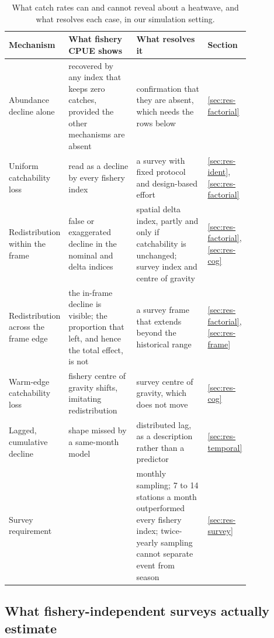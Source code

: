 \documentclass[11pt,a4paper]{article}
\begin{document}
\begin{table}[tbp]
\centering\footnotesize
\caption{What catch rates can and cannot reveal about a heatwave, and what resolves each case, in our simulation setting.}
\label{tab:synthesis}
\begin{tabular}{@{}>{\raggedright\arraybackslash}p{0.2\linewidth}>{\raggedright\arraybackslash}p{0.3\linewidth}>{\raggedright\arraybackslash}p{0.32\linewidth}l@{}}
\toprule
Mechanism & What fishery CPUE shows & What resolves it & Section \\
\midrule
Abundance decline alone & recovered by any index that keeps zero catches, provided the other mechanisms are absent & confirmation that they are absent, which needs the rows below & \ref{sec:res-factorial} \\
Uniform catchability loss & read as a decline by every fishery index & a survey with fixed protocol and design-based effort & \ref{sec:res-ident}, \ref{sec:res-factorial} \\
Redistribution within the frame & false or exaggerated decline in the nominal and delta indices & spatial delta index, partly and only if catchability is unchanged; survey index and centre of gravity & \ref{sec:res-factorial}, \ref{sec:res-cog} \\
Redistribution across the frame edge & the in-frame decline is visible; the proportion that left, and hence the total effect, is not & a survey frame that extends beyond the historical range & \ref{sec:res-factorial}, \ref{sec:res-frame} \\
Warm-edge catchability loss & fishery centre of gravity shifts, imitating redistribution & survey centre of gravity, which does not move & \ref{sec:res-cog} \\
Lagged, cumulative decline & shape missed by a same-month model & distributed lag, as a description rather than a predictor & \ref{sec:res-temporal} \\
Survey requirement & & monthly sampling; 7 to 14 stations a month outperformed every fishery index; twice-yearly sampling cannot separate event from season & \ref{sec:res-survey} \\
\bottomrule
\end{tabular}
\end{table}

\subsection{What fishery-independent surveys actually estimate}
\end{document}
